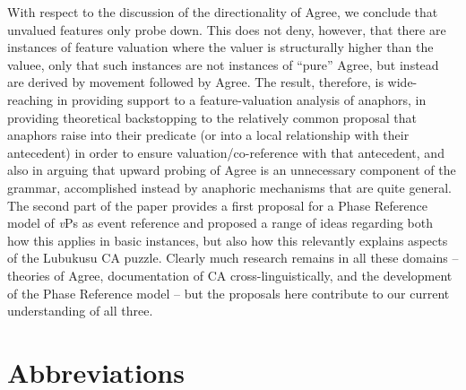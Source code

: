\documentclass[output=paper
,modfonts
,nonflat
]{langsci/langscibook}
\begin{document}
With respect to the discussion of the directionality of Agree, we conclude that unvalued features only probe down.  This does not deny, however, that there are instances of feature valuation where the valuer is structurally higher than the valuee, only that such instances are not instances of ``pure'' Agree, but instead are derived by movement followed by Agree. The result, therefore, is wide-reaching in providing support to a feature-valuation analysis of anaphors, in providing theoretical backstopping to the relatively common proposal that anaphors raise into their predicate (or into a local relationship with their antecedent) in order to ensure valuation/co-reference with that antecedent, and also in arguing that upward probing of Agree is an unnecessary component of the grammar, accomplished instead by anaphoric mechanisms that are quite general. The second part of the paper provides a first proposal for a Phase Reference model of \textit{v}Ps as event reference and proposed a range of ideas regarding both how this applies in basic instances, but also how this relevantly explains aspects of the Lubukusu CA puzzle. Clearly much research remains in all these domains -- theories of Agree, documentation of CA cross-linguistically, and the development of the Phase Reference model -- but the proposals here contribute to our current understanding of all three. 

\section*{Abbreviations}
\end{document}
